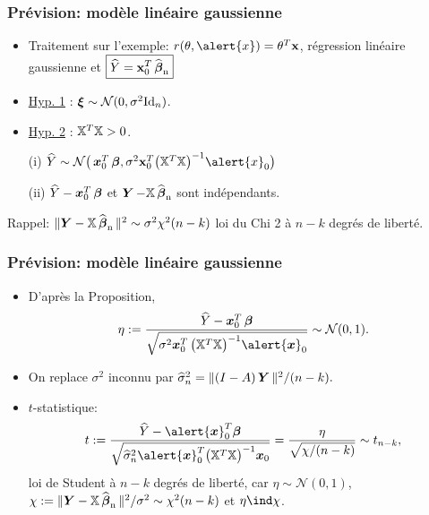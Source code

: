 \begin{frame}
\frametitle{Prévision: modèle linéaire gaussienne}
\begin{itemize}
\item Traitement sur l'exemple: $r(\truetheta, \alert{x})=\truetheta^T{\bf
x}$, régression \alert{linéaire gaussienne} et $\boxed{\widehat Y = {\bf
x}_0^T\operatorname{\widehat{\boldsymbol{\beta}}_n}}$
\item \underline{Hyp. 1} : $\boldsymbol{\xi} \sim {\mathcal N}(0,\sigma^2\mathrm{Id}_n)$.
\item \underline{Hyp. 2} : $\mathbb{X}^T \mathbb{X}>0$.
\end{itemize}
\begin{prop}
\begin{itemize}
\item[(i)] $\widehat Y \sim {\mathcal N}\big(\bx_0^T\truebeta, \sigma^2 {\bf
x}_0^T\big(\regressmat^T\regressmat\big)^{-1}\alert{x}_0\big)$
\item[(ii)] $\widehat Y- \operatorname{\boldsymbol{x}}_0^T\boldsymbol{\beta}$ et $\operatorname{\boldsymbol{Y}}-\mathbb{X} \operatorname{\widehat{\boldsymbol{\beta}}_n}$ sont
indépendants.
\end{itemize}
\end{prop}
Rappel: $\|\boldsymbol{Y}-\mathbb{X} \operatorname{\widehat{\boldsymbol{\beta}}_n}\|^2 \sim
\sigma^2\chi^2(n-k)$ \alert{ loi du Chi 2 à $n-k$ degrés de
liberté}.
\end{frame}

\begin{frame}
\frametitle{Prévision: modèle linéaire gaussienne}
\begin{itemize}
\item D'après la Proposition,
$$
\eta:=\frac{\widehat Y - \bx_0^T\truebeta}{\sqrt{\sigma^2 {\bx_0^T\big(\regressmat^T\regressmat\big)^{-1}\alert{\bx}_0}}} 
\sim {\mathcal N}(0,1).
$$
\item On replace $\sigma^2$ inconnu par $\widehat \sigma_n^2 =
{\|(I-A) \operatorname{\boldsymbol{Y}} \|^2}/({n-k}).$
\item \alert{$t$-statistique:}
$$
t:= \frac{\widehat Y -\alert{\bx}_0^T\truebeta}{\sqrt{\widehat
\sigma_n^2 \alert{\bx}_0^T\big(\regressmat^T\regressmat\big)^{-1}{
\bx_0}}}=\frac{\eta}{\sqrt{\chi/(n-k)}}\sim t_{n-k},
$$
\alert{loi de Student à $n-k$ degrés de liberté}, car $\eta\sim
{\mathcal N}(0,1)$, $\chi:=\|\boldsymbol{Y}-\mathbb{X}
\operatorname{\widehat{\boldsymbol{\beta}}_n}\|^2/\sigma^2\sim \chi^2(n-k)$ et $\eta\ind\chi$.
\end{itemize}
\end{frame}

